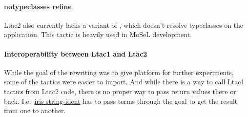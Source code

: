 \paragraph{notypeclasses refine}

Ltac2 also currently lacks a variant of , which doesn't resolve typeclasses on the application.
This tactic is heavily used in MoSeL development.

\paragraph{Interoperability between Ltac1 and Ltac2}

While the goal of the rewriting was to give platform for further experiments, some of the tactics were easier to import.
And while there is a way to call Ltac1 tactics from Ltac2 code, there is no proper way to pass return values there or back.
I.e.\ \href{https://gitlab.mpi-sws.org/iris/string-ident/}{iris string-ident} has to pass terms through the goal to get the result from one to another.


